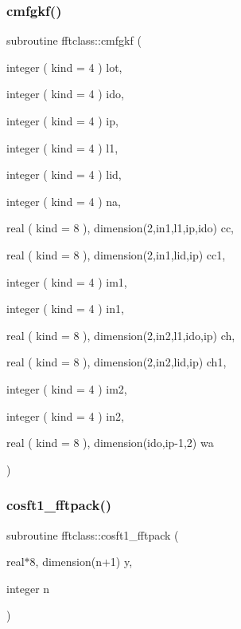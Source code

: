 \subsubsection{\texorpdfstring{cmfgkf()}{cmfgkf()}}
{\footnotesize\ttfamily subroutine fftclass\+::cmfgkf (\begin{DoxyParamCaption}\item[{integer ( kind = 4 )}]{lot,  }\item[{integer ( kind = 4 )}]{ido,  }\item[{integer ( kind = 4 )}]{ip,  }\item[{integer ( kind = 4 )}]{l1,  }\item[{integer ( kind = 4 )}]{lid,  }\item[{integer ( kind = 4 )}]{na,  }\item[{real ( kind = 8 ), dimension(2,in1,l1,ip,ido)}]{cc,  }\item[{real ( kind = 8 ), dimension(2,in1,lid,ip)}]{cc1,  }\item[{integer ( kind = 4 )}]{im1,  }\item[{integer ( kind = 4 )}]{in1,  }\item[{real ( kind = 8 ), dimension(2,in2,l1,ido,ip)}]{ch,  }\item[{real ( kind = 8 ), dimension(2,in2,lid,ip)}]{ch1,  }\item[{integer ( kind = 4 )}]{im2,  }\item[{integer ( kind = 4 )}]{in2,  }\item[{real ( kind = 8 ), dimension(ido,ip-\/1,2)}]{wa }\end{DoxyParamCaption})}

\mbox{\label{namespacefftclass_ac4347b89b0b1a5894943daa3f37c54ee}} 
\subsubsection{\texorpdfstring{cosft1\_fftpack()}{cosft1\_fftpack()}}
{\footnotesize\ttfamily subroutine fftclass\+::cosft1\+\_\+fftpack (\begin{DoxyParamCaption}\item[{real$\ast$8, dimension(n+1)}]{y,  }\item[{integer}]{n }\end{DoxyParamCaption})}



